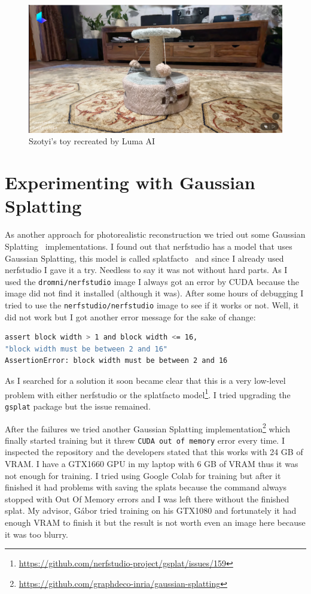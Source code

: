\begin{figure}[htbp]
	\centering
	\includegraphics[width=150mm, keepaspectratio]{figures/szotyi_jateka_luma_ai.png}
	\caption{Szotyi's toy recreated by Luma AI}
	\label{fig:luma_ai_szotyi_toy}
\end{figure}

\section{Experimenting with Gaussian Splatting}

As another approach for photorealistic reconstruction we tried out some Gaussian Splatting~\cite{3DGS} implementations. I found out that nerfstudio has a model that uses Gaussian Splatting, this model is called splatfacto~\cite{splatfacto} and since I already used nerfstudio I gave it a try. Needless to say it was not without hard parts. As I used the \verb|dromni/nerfstudio| image I always got an error by CUDA because the image did not find it installed (although it was). After some hours of debugging I tried to use the \verb|nerfstudio/nerfstudio| image to see if it works or not. Well, it did not work but I got another error message for the sake of change:

\FloatBarrier
\begin{lstlisting}[language=bash,frame=single,float=!ht]
assert block width > 1 and block width <= 16, 
"block width must be between 2 and 16"
AssertionError: block width must be between 2 and 16
\end{lstlisting}

As I searched for a solution it soon became clear that this is a very low-level problem with either nerfstudio or the splatfacto model\footnote{\url{https://github.com/nerfstudio-project/gsplat/issues/159}}. I tried upgrading the \verb|gsplat| package but the issue remained.

After the failures we tried another Gaussian Splatting implementation\footnote{\url{https://github.com/graphdeco-inria/gaussian-splatting}} which finally started training but it threw \verb|CUDA out of memory| error every time. I inspected the repository and the developers stated that this works with 24 GB of VRAM. I have a GTX1660 GPU in my laptop with 6 GB of VRAM thus it was not enough for training. I tried using Google Colab for training but after it finished it had problems with saving the splats because the command always stopped with Out Of Memory errors and I was left there without the finished splat. My advisor, Gábor tried training on his GTX1080 and fortunately it had enough VRAM to finish it but the result is not worth even an image here because it was too blurry.
